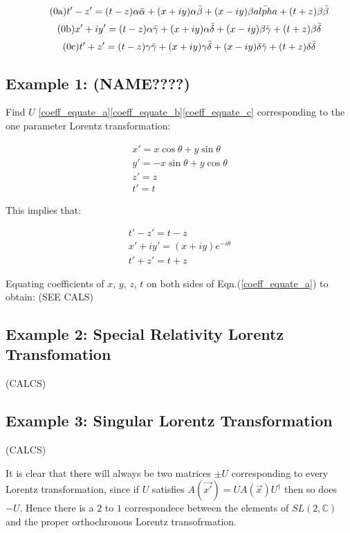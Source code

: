 \begin{equation}\label{coeff_equate_a}
\tag{{\theequation}a}
t' - z' = (t-z)\alpha\bar{\alpha} + (x + iy)\alpha\bar{\beta} + (x - iy)\beta\bar{alpha} + (t+z)\beta\bar{\beta}
\end{equation}
\begin{equation}\label{coeff_equate_b}
\tag{{\theequation}b}
x' + iy' = (t-z)\alpha\bar{\gamma} + (x + iy)\alpha\bar{\delta} + (x-iy)\beta\bar{\gamma} + (t+z)\beta\bar{\delta}
\end{equation}
\begin{equation}\label{coeff_equate_c}
\tag{{\theequation}c}
t' + z' = (t-z)\gamma\bar{\gamma} + (x + iy)\gamma\bar{\delta} + (x-iy)\delta\bar{\gamma} + (t+z)\delta\bar{\delta}
\end{equation}

\subsection{Example 1: (NAME????)}

\noindent Find $U$ \ref{coeff_equate_a}\ref{coeff_equate_b}\ref{coeff_equate_c} corresponding to the one parameter Lorentz transformation:

\begin{eqnarray*} 
x' = x\cos{\theta} + y\sin{\theta} \\
y' = -x\sin{\theta} + y\cos{\theta} \\
z' = z \\
t' = t
\end{eqnarray*} 

\noindent This implies that:

\begin{eqnarray*}
t'-z' = t-z \\
x'+iy' = (x+iy) e^{-i \theta} \\
t'+z' = t+z
\end{eqnarray*}

Equating coefficients of $x$, $y$, $z$, $t$ on both sides of Eqn.(\ref{coeff_equate_a}) to obtain: (SEE CALS)

\subsection{Example 2: Special Relativity Lorentz Transfomation}\label{Special_Linear_Matrices_Example_2}

(CALCS)

\subsection{Example 3: Singular Lorentz Transformation}\label{Special_Linear_Matrices_Example_3}

(CALCS)

It is clear that there will always be two matrices $\pm U$ corresponding to every Lorentz transformation, since if $U$ satisfies $A(\vec{x'}) = U A(\vec{x}) U^{\dagger}$ then so does $-U$. Hence there is a $2$ to $1$ correspondece between the elements of $SL(2,\mathbb{C})$ and the proper orthochronous Lorentz transofrmation.

